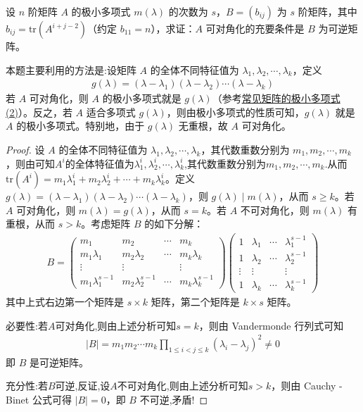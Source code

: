 \documentclass[../../main.tex]{subfiles}%
\begin{document}
\begin{proposition}
设 $n$ 阶矩阵 $A$ 的极小多项式 $m(\lambda)$ 的次数为 $s$，$B = (b_{ij})$ 为 $s$ 阶矩阵，其中 $b_{ij}=\mathrm{tr}(A^{i + j - 2})$（约定 $b_{11}=n$），求证：$A$ 可对角化的充要条件是 $B$ 为可逆矩阵。
\end{proposition}
\begin{remark}
本题主要利用的方法是:设矩阵 $A$ 的全体不同特征值为 $\lambda_1,\lambda_2,\cdots,\lambda_k$，定义
\begin{align*}
g(\lambda)=(\lambda - \lambda_1)(\lambda - \lambda_2)\cdots(\lambda - \lambda_k)
\end{align*}
若 $A$ 可对角化，则 $A$ 的极小多项式就是 $g(\lambda)$（参考\hyperref[proposition:常见矩阵的极小多项式]{常见矩阵的极小多项式(2)}）。反之，若 $A$ 适合多项式 $g(\lambda)$，则由极小多项式的性质可知，$g(\lambda)$ 就是 $A$ 的极小多项式。特别地，由于 $g(\lambda)$ 无重根，故 $A$ 可对角化。
\end{remark}
\begin{proof}

设 $A$ 的全体不同特征值为 $\lambda_1,\lambda_2,\cdots,\lambda_k$，其代数重数分别为 $m_1,m_2,\cdots,m_k$，则由可知$A^i$的全体特征值为$\lambda^i_1,\lambda^i_2,\cdots,\lambda^i_k$,其代数重数分别为$m_1,m_2,\cdots,m_k$.从而$\mathrm{tr}(A^i)=m_1\lambda_1^i + m_2\lambda_2^i + \cdots + m_k\lambda_k^i$。定义 $g(\lambda)=(\lambda - \lambda_1)(\lambda - \lambda_2)\cdots(\lambda - \lambda_k)$，则 $g(\lambda)\mid m(\lambda)$，从而 $s\geqslant  k$。若 $A$ 可对角化，则 $m(\lambda)=g(\lambda)$，从而 $s = k$。若 $A$ 不可对角化，则 $m(\lambda)$ 有重根，从而 $s > k$。考虑矩阵 $B$ 的如下分解：
\begin{align*}
B=\begin{pmatrix}
m_1 & m_2 & \cdots & m_k \\
m_1\lambda_1 & m_2\lambda_2 & \cdots & m_k\lambda_k \\
\vdots & \vdots & & \vdots \\
m_1\lambda_1^{s - 1} & m_2\lambda_2^{s - 1} & \cdots & m_k\lambda_k^{s - 1}
\end{pmatrix}\begin{pmatrix}
1 & \lambda_1 & \cdots & \lambda_1^{s - 1} \\
1 & \lambda_2 & \cdots & \lambda_2^{s - 1} \\
\vdots & \vdots & & \vdots \\
1 & \lambda_k & \cdots & \lambda_k^{s - 1}
\end{pmatrix}
\end{align*}
其中上式右边第一个矩阵是 $s\times k$ 矩阵，第二个矩阵是 $k\times s$ 矩阵。

{\heiti 必要性:}若$A$可对角化,则由上述分析可知$s = k$，则由 Vandermonde 行列式可知
\begin{align*}
|B|=m_1m_2\cdots m_k\prod_{1\leqslant  i < j\leqslant  k}(\lambda_i - \lambda_j)^2\neq 0
\end{align*}
即 $B$ 是可逆矩阵。

{\heiti 充分性:}若$B$可逆,反证,设$A$不可对角化,则由上述分析可知$s > k$，则由 Cauchy - Binet 公式可得 $|B| = 0$，即 $B$ 不可逆,矛盾!

\end{proof}
\end{document}

